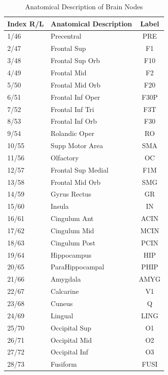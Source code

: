 \documentclass[fleqn,10pt]{wlpeerj}
\begin{document}
\begin{table}[htbp] 
\centering
\caption[Automated Anatomical Labeling for the Brain Regions]{\label{tab:AAL}Anatomical Description of Brain Nodes }

\begin{tabular}{l | l | c}

Index R/L & Anatomical Description & Label \\ \hline  \hline 
  1/46 & Precentral & PRE   \\ 
  2/47 & Frontal Sup & F1 \\
3/48 & Frontal Sup Orb    &      F10 \\
4/49 & Frontal Mid        &       F2\\
5/50 & Frontal Mid Orb    &      F20\\
6/51 & Frontal Inf Oper   &    F30P\\
7/52 & Frontal Inf Tri    &     F3T\\
8/53 & Frontal Inf Orb    &      F30\\
9/54 & Rolandic Oper      &      RO\\
10/55 & Supp Motor Area  &      SMA\\
11/56 & Olfactory          &      OC\\
12/57 & Frontal Sup Medial  &   F1M\\
13/58 & Frontal Mid Orb     &   SMG\\
14/59 & Gyrus Rectus         &    GR\\
15/60 & Insula              &      IN\\
16/61 & Cingulum Ant       &   ACIN\\
17/62 & Cingulum Mid        &  MCIN\\
18/63 & Cingulum Post        & PCIN\\
19/64 & Hippocampus         &    HIP\\
20/65 & ParaHippocampal     &  PHIP\\
21/66 & Amygdala           &  AMYG\\
22/67 & Calcarine          &       V1\\
23/68 & Cuneus             &        Q\\
24/69 & Lingual            &   LING\\
25/70 & Occipital Sup      &       O1\\
26/71 & Occipital Mid      &       O2\\
27/72 & Occipital Inf      &       O3\\
28/73 & Fusiform           &    FUSI\\

\end{tabular}
\end{table}
\end{document}
